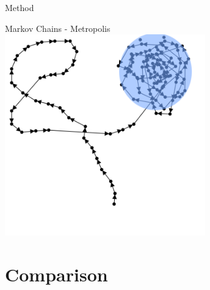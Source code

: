 \documentclass[t,10pt,fleqn]{beamer}
\begin{document}
\begin{frame}{Method}
	\vspace{-.3cm}
	\centering
	\begin{block}{Markov Chains - Metropolis}
		\includegraphics[width=0.65\textwidth]{mcmc-circling}
	\end{block}
\end{frame}



\section{Comparison}
\end{document}
